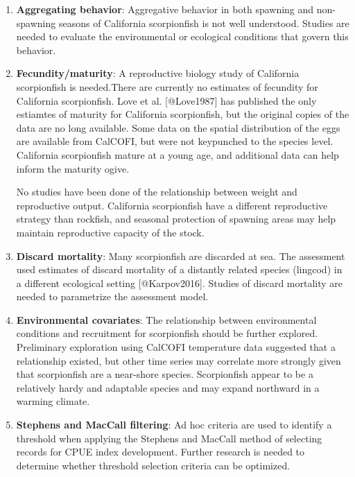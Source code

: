 \documentclass[12pt,]{article}
\begin{document}
\begin{enumerate}
\item \textbf{Aggregating behavior}: Aggregative behavior in both spawning and 
non-spawning seasons of California scorpionfish is not well understood. Studies are 
needed to evaluate the environmental or ecological conditions that govern this behavior.



\item \textbf{Fecundity/maturity}: A reproductive biology study of California 
scorpionfish is needed.There are currently no estimates of fecundity 
for California scorpionfish.  Love et al. [@Love1987] has published the only 
estiamtes of maturity for California scorpionfish, but the original copies of 
the data are no long available.  Some data on the spatial distribution of the 
eggs are available from CalCOFI, but were not keypunched to the species level. 
California scorpionfish mature at a young age, and additional data can help 
inform the maturity ogive.

No studies have been done of the relationship between weight and reproductive 
output.  California scorpionfish have a different reproductive strategy than rockfish, 
and seasonal protection of spawning areas may help maintain reproductive capacity 
of the stock.

\item \textbf{Discard mortality}: Many scorpionfish are discarded at sea. The assessment 
used estimates of discard mortality of a distantly related species (lingcod) 
in a different ecological setting [@Karpov2016]. Studies of discard mortality are needed 
to parametrize the assessment model.

\item \textbf{Environmental covariates}: The relationship between environmental 
conditions and recruitment for scorpionfish should be further explored. Preliminary 
exploration using CalCOFI temperature data suggested that a relationship existed, 
but other time series may correlate more strongly given that scorpionfish are a 
near-shore species.  Scorpionfish appear to be a relatively hardy and adaptable 
species and may expand northward in a warming climate.  


\item \textbf{Stephens and MacCall filtering}: Ad hoc criteria are used to identify 
a threshold when applying the Stephens and MacCall method of selecting records for 
CPUE index development.  Further research is needed to determine whether threshold 
selection criteria can be optimized.



\end{enumerate}
\end{document}
